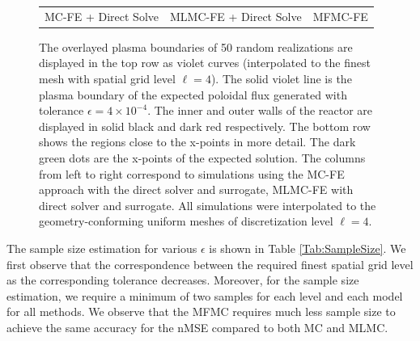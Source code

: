 \begin{figure}[ht!]
\begin{tabular}{ccc}
\\[1ex]
\quad MC-FE + Direct Solve &MLMC-FE + Direct Solve &MFMC-FE  \\[-0.5ex]
\end{tabular}
\caption{The overlayed plasma boundaries of 50 random realizations are 
displayed in the top row as violet curves (interpolated to the finest mesh with spatial grid level $\ell=4$). The solid violet line is the plasma boundary of the expected 
poloidal flux generated with tolerance $\epsilon=4\times 10^{-4}$. 
The inner and outer walls of the reactor are displayed in solid black and 
dark red respectively. The bottom row shows the regions close to the 
x-points in more detail. The dark green dots are the x-points of the expected 
solution. The columns from left to right correspond to simulations using the 
MC-FE approach with the direct solver and surrogate, MLMC-FE with direct 
solver and surrogate. All simulations were interpolated to the geometry-conforming uniform meshes of discretization level $\ell=4$.} 
\label{fig:QoI_plot}
\end{figure}
%





The sample size estimation for various $\epsilon$ is shown in Table \ref{Tab:SampleSize}. We first observe that the correspondence between the required finest spatial grid level as the corresponding tolerance decreases. Moreover, for the sample size estimation, we require a minimum of two samples for each level and each model for all methods. We observe that the MFMC requires much less sample size to achieve the same accuracy for the nMSE compared to both MC and MLMC.



